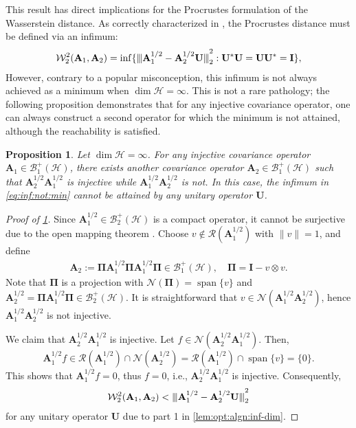 \documentclass[noinfoline]{imsart}\setcounter{tocdepth}{2}
\newcommand{\m}[1]{\mathbf{#1}} %
\renewcommand{\c}[1]{\mathcal{#1}} %
\DeclareMathOperator*{\spann}{span}
\newcommand{\vertii}[1]{{\vert\kern-0.25ex\vert\kern-0.25ex\vert #1 
    \vert\kern-0.25ex\vert\kern-0.25ex\vert}} %
\theoremstyle{plain}
\newtheorem{proposition}[theorem]{Proposition}
\begin{document}
This result has direct implications for the Procrustes formulation of the Wasserstein distance. As correctly characterized in \cite{pigoli2014distances, masarotto2019procrustes}, the Procrustes distance must be defined via an infimum:
\begin{align}\label{eq:inf:not:min}
    \c{W}_{2}^{2}(\m{A}_{1}, \m{A}_{2}) = \inf \{\vertii{\m{A}_{1}^{1/2} - \m{A}_{2}^{1/2} \m{U}}_{2}^{2} : \m{U}^{*} \m{U} = \m{U} \m{U}^{*} = \m{I} \},
\end{align}
However, contrary to a popular misconception, this infimum is not always achieved as a minimum when $\dim \c{H} = \infty$. This is not a rare pathology; the following proposition demonstrates that for any injective covariance operator, one can always construct a second operator for which the minimum is not attained, although the reachability is satisfied.

\begin{proposition}\label{prop:inf:not:min}
Let $\dim \c{H} = \infty$. For any injective covariance operator $\m{A}_{1} \in \c{B}_{1}^{+}(\c{H})$, there exists another covariance operator $\m{A}_{2} \in \c{B}_{1}^{+}(\c{H})$ such that $\m{A}_{2}^{1/2} \m{A}_{1}^{1/2}$ is injective while $\m{A}_{1}^{1/2} \m{A}_{2}^{1/2}$ is not. In this case, the infimum in \eqref{eq:inf:not:min} cannot be attained by any unitary operator $\m{U}$.
\end{proposition}

\begin{proof}[Proof of \cref{prop:inf:not:min}]
Since $\m{A}_{1}^{1/2} \in \c{B}_{2}^{+}(\c{H})$ is a compact operator, it cannot be surjective due to the open mapping theorem \cite{conway2019course}. Choose $v \notin \c{R}(\m{A}_{1}^{1/2})$ with $\|v\| = 1$, and define
\begin{align*}
    \m{A}_{2} := \m{\Pi} \m{A}_{1}^{1/2} \m{\Pi} \m{A}_{1}^{1/2} \m{\Pi} \in \c{B}_{1}^{+}(\c{H}), \quad \m{\Pi} = \m{I} - v \otimes v.
\end{align*}
Note that $\m{\Pi}$ is a projection with $\c{N}(\m{\Pi}) = \spann \{v\}$ and $\m{A}_{2}^{1/2} = \m{\Pi} \m{A}_{1}^{1/2} \m{\Pi} \in \c{B}_{2}^{+}(\c{H})$. It is straightforward that $v \in \c{N}(\m{A}_{1}^{1/2} \m{A}_{2}^{1/2})$, hence $\m{A}_{1}^{1/2} \m{A}_{2}^{1/2}$ is not injective.

We claim that $\m{A}_{2}^{1/2} \m{A}_{1}^{1/2}$ is injective. Let $f \in \c{N}(\m{A}_{2}^{1/2} \m{A}_{1}^{1/2})$. Then,
\begin{equation*}
    \m{A}_{1}^{1/2} f \in \c{R}(\m{A}_{1}^{1/2}) \cap \c{N}(\m{A}_{2}^{1/2}) = \c{R}(\m{A}_{1}^{1/2}) \cap \spann \{v\} = \{0\}.
\end{equation*}
This shows that $\m{A}_{1}^{1/2} f = 0$, thus $f = 0$, i.e., $\m{A}_{2}^{1/2} \m{A}_{1}^{1/2}$ is injective. Consequently, 
\begin{align*}
    \c{W}_{2}^{2}(\m{A}_{1}, \m{A}_{2}) < \vertii{\m{A}_{1}^{1/2} - \m{A}_{2}^{1/2} \m{U}}_{2}^{2}
\end{align*}
for any unitary operator $\m{U}$ due to 
part 1 in \cref{lem:opt:algn:inf-dim}.
\end{proof}
\end{document}
